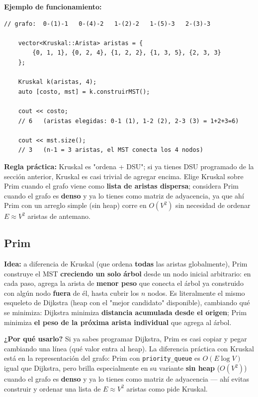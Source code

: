 \documentclass[10pt,a4paper,twocolumn]{article}
\begin{document}
\textbf{Ejemplo de funcionamiento:}

\begin{lstlisting}[style=cpp]
	// grafo:  0-(1)-1   0-(4)-2   1-(2)-2   1-(5)-3   2-(3)-3
	
	vector<Kruskal::Arista> aristas = {
		{0, 1, 1}, {0, 2, 4}, {1, 2, 2}, {1, 3, 5}, {2, 3, 3}
	};
	
	Kruskal k(aristas, 4);
	auto [costo, mst] = k.construirMST();
	
	cout << costo;
	// 6   (aristas elegidas: 0-1 (1), 1-2 (2), 2-3 (3) = 1+2+3=6)
	
	cout << mst.size();
	// 3   (n-1 = 3 aristas, el MST conecta los 4 nodos)
\end{lstlisting}

\textbf{Regla práctica:} Kruskal es "ordena + DSU"; si ya tienes DSU
programado de la sección anterior, Kruskal es casi trivial de
agregar encima. Elige Kruskal sobre Prim cuando el grafo viene como
\textbf{lista de aristas dispersa}; considera Prim cuando el grafo es
\textbf{denso} y ya lo tienes como matriz de adyacencia, ya que ahí
Prim con un arreglo simple (sin heap) corre en $O(V^2)$ sin necesidad
de ordenar $E \approx V^2$ aristas de antemano.

\subsection{Prim}

\textbf{Idea:} a diferencia de Kruskal (que ordena \textbf{todas}
las aristas globalmente), Prim construye el MST \textbf{creciendo un
	solo árbol} desde un nodo inicial arbitrario: en cada paso, agrega la
arista de \textbf{menor peso} que conecta el árbol ya construido con
algún nodo \textbf{fuera} de él, hasta cubrir los $n$ nodos. Es
literalmente el mismo esqueleto de Dijkstra (heap con el "mejor
candidato" disponible), cambiando qué se minimiza: Dijkstra minimiza
\textbf{distancia acumulada desde el origen}; Prim minimiza
\textbf{el peso de la próxima arista individual} que agrega al árbol.

\textbf{¿Por qué usarlo?} Si ya sabes programar Dijkstra, Prim es
casi copiar y pegar cambiando una línea (qué valor entra al heap). La
diferencia práctica con Kruskal está en la representación del grafo:
Prim con \texttt{priority\_queue} es $O(E \log V)$ igual que
Dijkstra, pero brilla especialmente en su variante \textbf{sin heap}
($O(V^2)$) cuando el grafo es \textbf{denso} y ya lo tienes como
matriz de adyacencia — ahí evitas construir y ordenar una lista de
$E \approx V^2$ aristas como pide Kruskal.
\end{document}
